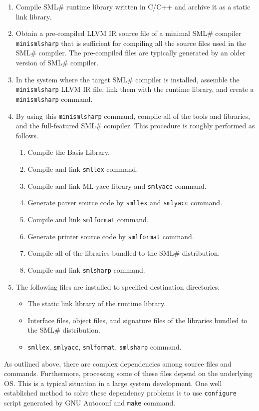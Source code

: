 \documentclass{jbook}
\newcommand{\smlsharp}{SML\#}
\begin{document}
\begin{enumerate}
\item
	Compile \smlsharp{} runtime library written in C/C++ and archive it
as a static link library.
\item 
	Obtain a pre-compiled LLVM IR source file of a minimal \smlsharp{}
compiler
{\tt minismlsharp} that is sufficient for compiling all the source files
used in the \smlsharp{} compiler. 
	The pre-compiled files are typically generated by an older version
of \smlsharp{} compiler. 
\item 
	In the system where the target \smlsharp{} compiler is
installed, assemble the {\tt minismlsharp} LLVM IR file, link them
with the runtime library, and create a {\tt minismlsharp} command.
\item
	By using this {\tt minismlsharp} command, compile all of the tools
and libraries, and the full-featured \smlsharp{} compiler.
	This procedure is roughly performed as follows.
\begin{enumerate}
\item Compile the Basis Library.
\item Compile and link {\tt smllex} command.
\item Compile and link ML-yacc library and {\tt smlyacc} command.
\item Generate parser source code by {\tt smllex} and {\tt smlyacc} command.
\item Compile and link {\tt smlformat} command.
\item Generate printer source code by {\tt smlformat} command.
\item Compile all of the libraries bundled to the \smlsharp{} distribution.
\item Compile and link {\tt smlsharp} command.
\end{enumerate}
\item The following files are installed to specified destination directories.
\begin{itemize}
\item The static link library of the runtime library.
\item Interface files, object files, and signature files of the libraries
bundled to the \smlsharp{} distribution.
\item {\tt smllex}, {\tt smlyacc}, {\tt smlformat}, {\tt smlsharp} command.
\end{itemize}
\end{enumerate}

	As outlined above, there are complex dependencies among source
files and commands.
	Furthermore, processing some of these files depend on the
underlying OS.
	This is a typical situation in a large system development.
	One well established method to solve these dependency problems is
to use {\tt configure} script generated by GNU Autoconf and
{\tt make} command.
\end{document}
